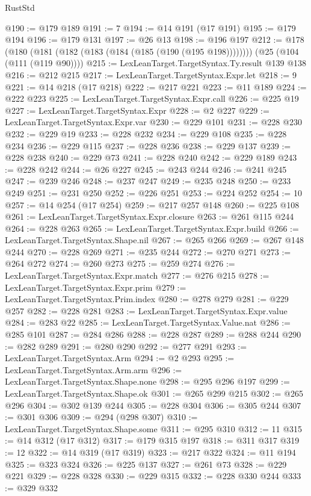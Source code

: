 \begin{lexlean}{RustStd}
\begin{coremodule}
@190 := @179 @189
@191 := 7
@194 := @14 @191 (@17 @191)
@195 := @179 @194
@196 := @179 @131
@197 := @26 @13
@198 := @196 @197
@212 := @178
    (@180 (@181 (@182 (@183 (@184 (@185 (@190 (@195 @198))))))))
    (@25 (@104 (@111 (@119 @90))))
@215 := LexLeanTarget.TargetSyntax.Ty.result @139 @138
@216 := @212 @215
@217 := LexLeanTarget.TargetSyntax.Expr.let
@218 := 9
@221 := @14 @218 (@17 @218)
@222 := @217 @221
@223 := @11 @189
@224 := @222 @223
@225 := LexLeanTarget.TargetSyntax.Expr.call
@226 := @225 @19
@227 := LexLeanTarget.TargetSyntax.Expr
@228 := @2 @227
@229 := LexLeanTarget.TargetSyntax.Expr.var
@230 := @229 @101
@231 := @228 @230
@232 := @229 @19
@233 := @228 @232
@234 := @229 @108
@235 := @228 @234
@236 := @229 @115
@237 := @228 @236
@238 := @229 @137
@239 := @228 @238
@240 := @229 @73
@241 := @228 @240
@242 := @229 @189
@243 := @228 @242
@244 := @26 @227
@245 := @243 @244
@246 := @241 @245
@247 := @239 @246
@248 := @237 @247
@249 := @235 @248
@250 := @233 @249
@251 := @231 @250
@252 := @226 @251
@253 := @224 @252
@254 := 10
@257 := @14 @254 (@17 @254)
@259 := @217 @257 @148
@260 := @225 @108
@261 := LexLeanTarget.TargetSyntax.Expr.closure
@263 := @261 @115 @244
@264 := @228 @263
@265 := LexLeanTarget.TargetSyntax.Expr.build
@266 := LexLeanTarget.TargetSyntax.Shape.nil
@267 := @265 @266
@269 := @267 @148 @244
@270 := @228 @269
@271 := @235 @244
@272 := @270 @271
@273 := @264 @272
@274 := @260 @273
@275 := @259 @274
@276 := LexLeanTarget.TargetSyntax.Expr.match
@277 := @276 @215
@278 := LexLeanTarget.TargetSyntax.Expr.prim
@279 := LexLeanTarget.TargetSyntax.Prim.index
@280 := @278 @279
@281 := @229 @257
@282 := @228 @281
@283 := LexLeanTarget.TargetSyntax.Expr.value
@284 := @283 @22
@285 := LexLeanTarget.TargetSyntax.Value.nat
@286 := @285 @101
@287 := @284 @286
@288 := @228 @287
@289 := @288 @244
@290 := @282 @289
@291 := @280 @290
@292 := @277 @291
@293 := LexLeanTarget.TargetSyntax.Arm
@294 := @2 @293
@295 := LexLeanTarget.TargetSyntax.Arm.arm
@296 := LexLeanTarget.TargetSyntax.Shape.none
@298 := @295 @296 @197
@299 := LexLeanTarget.TargetSyntax.Shape.ok
@301 := @265 @299 @215
@302 := @265 @296
@304 := @302 @139 @244
@305 := @228 @304
@306 := @305 @244
@307 := @301 @306
@309 := @294 (@298 @307)
@310 := LexLeanTarget.TargetSyntax.Shape.some
@311 := @295 @310
@312 := 11
@315 := @14 @312 (@17 @312)
@317 := @179 @315 @197
@318 := @311 @317
@319 := 12
@322 := @14 @319 (@17 @319)
@323 := @217 @322
@324 := @11 @194
@325 := @323 @324
@326 := @225 @137
@327 := @261 @73
@328 := @229 @221
@329 := @228 @328
@330 := @229 @315
@332 := @228 @330 @244
@333 := @329 @332

\end{coremodule}
\end{lexlean}

